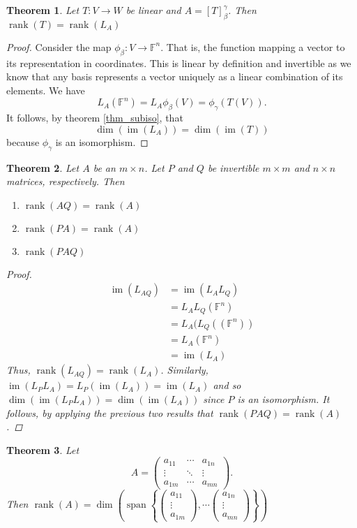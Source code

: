 \documentclass[oneside, 12pt]{book}
\DeclareMathOperator{\rank}{rank}
\DeclareMathOperator{\spn}{span}
\DeclareMathOperator{\im}{im}
\newtheorem{thm}{Theorem}[section]
\theoremstyle{definition}
\begin{document}
\begin{thm}
\label{rnkeq}
  Let $T: V \to W$ be linear and $A=[T]_{\beta}^{\gamma}$. Then $\rank(T)=\rank(L_{A})$
\end{thm}
\begin{proof}
  Consider the map $\phi_{\beta}:V \to \mathbb{F}^{n}$. That is, the function mapping a vector to its representation in coordinates. This is linear by definition and invertible as we know that any basis represents a vector uniquely as a linear combination of its elements. We have
  \[L_{A}(\mathbb{F}^{n})=L_{A}\phi_{\beta}(V)=\phi_{\gamma}(T(V)).\] It follows, by theorem \ref{thm_subiso},  that \[\dim(\im(L_{A}))=\dim(\im(T))\] because $\phi_{\gamma}$ is an isomorphism.
\end{proof}
\begin{thm}
\label{thm_rnkprp}
  Let $A$ be an $m \times n$. Let $P$ and $Q$ be invertible $m \times m$ and $n \times n$ matrices, respectively.
  Then
  \begin{enumerate}
    \item $\rank(AQ)=\rank(A)$
    \item $\rank(PA)=\rank(A)$
    \item $\rank(PAQ)$
  \end{enumerate}
  \begin{proof}
    \begin{align}
      \im(L_{AQ})&=\im(L_{A}L_{Q}) \\
                 &= L_{A}L_{Q}(\mathbb{F}^{n}) \\
                 &= L_{A}(L_{Q}((\mathbb{F}^{n})) \\
                 &= L_{A}(\mathbb{F}^{n}) \\
                 &=\im(L_{A})
    \end{align}
    Thus, $\rank(L_{AQ})=\rank(L_{A})$.
    Similarly, $\im(L_{P}L_{A})=L_{P}(\im(L_{A}))=\im(L_{A})$
    and so $\dim(\im(L_{P}L_{A}))=\dim(\im(L_{A}))$ since $P$ is an isomorphism.
    It follows, by applying the previous two results that
    $\rank(PAQ)=\rank(A)$.
  \end{proof}
\end{thm}
\begin{thm}
\label{thm_colm}
Let \[A=\begin{pmatrix}
          a_{11} & \cdots & a_{1n} \\
          \vdots & \ddots & \vdots \\
          a_{1m} & \cdots & a_{mn}

        \end{pmatrix}.\] Then $\rank(A)=\dim \left(
        \spn{ \left \{
          \begin{pmatrix} a_{11} \\ \vdots \\ a_{1m}\end{pmatrix}, \cdots \begin{pmatrix} a_{1n}\\ \vdots \\ a_{mn} \end{pmatrix}
        \right \}
        }\right )
        $
\end{thm}
\end{document}
